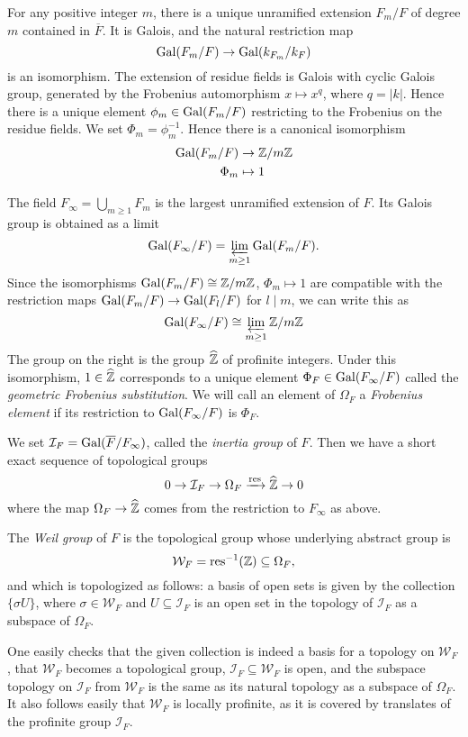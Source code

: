 For any positive integer $m$, there is a unique unramified extension $F_m/F$ of degree $m$ contained in $\overline{F}$. It is Galois, and the natural restriction map
\[\mathrm{Gal}(F_m/F)\to \mathrm{Gal}(k_{F_m}/k_F)\]
is an isomorphism. The extension of residue fields is Galois with cyclic Galois group, generated by the Frobenius automorphism $x\mapsto x^q$, where $q = |k|$. Hence there is a unique element $\phi_m\in \mathrm{Gal}(F_m/F)$ restricting to the Frobenius on the residue fields. We set $\Phi_m = \phi_m^{-1}$. Hence there is a canonical isomorphism
\begin{align*}
	\mathrm{Gal}(F_m/F)&\to \mathbb{Z}/m\mathbb{Z}\\
	\Phi_m&\mapsto 1
\end{align*}

The field $F_\infty = \bigcup_{m\ge1} F_m$ is the largest unramified extension of $F$. Its Galois group is obtained as a limit
\[\mathrm{Gal}(F_\infty/F) = \varprojlim_{m\ge 1}\mathrm{Gal}(F_m/F).\]
Since the isomorphisms $\mathrm{Gal}(F_m/F)\cong \mathbb{Z}/m\mathbb{Z}$, $\Phi_m\mapsto 1$ are compatible with the restriction maps $\mathrm{Gal}(F_m/F)\to\mathrm{Gal}(F_l/F)$ for $l\mid m$, we can write this as
\[\mathrm{Gal}(F_\infty/F)\cong \varprojlim_{m\ge 1} \mathbb{Z}/m\mathbb{Z}\]
The group on the right is the group $\widehat{\mathbb{Z}}$ of profinite integers. Under this isomorphism, $1\in \widehat{\mathbb{Z}}$ corresponds to a unique element $\Phi_F\in \mathrm{Gal}(F_\infty/F)$ called the \emph{geometric Frobenius substitution}. We will call an element of $\Omega_F$ a \emph{Frobenius element} if its restriction to $\mathrm{Gal}(F_\infty/F)$ is $\Phi_F$. 

We set $\mathcal{I}_F = \mathrm{Gal}(\overline{F}/F_\infty)$, called the \emph{inertia group} of $F$. Then we have a short exact sequence of topological groups
\[0 \to \mathcal{I}_F\to \Omega_F \xrightarrow{\text{res}} \widehat{\mathbb{Z}}\to 0\]
where the map $\Omega_F\to \widehat{\mathbb{Z}}$ comes from the restriction to $F_\infty$ as above.

\begin{defn}
	The \emph{Weil group} of $F$ is the topological group whose underlying abstract group is 
	\[\mathcal{W}_F = \text{res}^{-1}(\mathbb{Z})\subseteq \Omega_F,\]
	and which is topologized as follows: a basis of open sets is given by the collection $\{\sigma U\}$, where $\sigma \in \mathcal{W}_F$ and $U\subseteq \mathcal{I}_F$ is an open set in the topology of $\mathcal{I}_F$ as a subspace of $\Omega_F$.
\end{defn}
One easily checks that the given collection is indeed a basis for a topology on $\mathcal{W}_F$, that $\mathcal{W}_F$ becomes a topological group, $\mathcal{I}_F\subseteq \mathcal{W}_F$ is open, and the subspace topology on $\mathcal{I}_F$ from $\mathcal{W}_F$ is the same as its natural topology as a subspace of $\Omega_F$. It also follows easily that $\mathcal{W}_F$ is locally profinite, as it is covered by translates of the profinite group $\mathcal{I}_F$.

